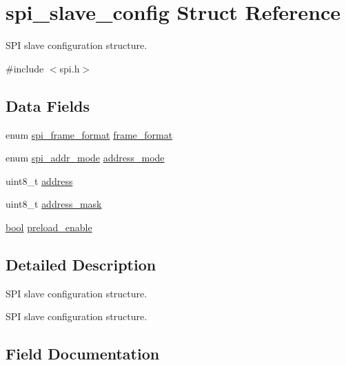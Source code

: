 \hypertarget{structspi__slave__config}{}\section{spi\+\_\+slave\+\_\+config Struct Reference}
\label{structspi__slave__config}


S\+PI slave configuration structure.  




{\ttfamily \#include $<$spi.\+h$>$}

\subsection*{Data Fields}
\begin{DoxyCompactItemize}
\item 
enum \mbox{\hyperlink{group__asfdoc__sam0__sercom__spi__group_ga4598fb059ff90fccf8c9fa5b421f1bda}{spi\+\_\+frame\+\_\+format}} \mbox{\hyperlink{structspi__slave__config_a74521dd3e152916391c75b1d5842aed5}{frame\+\_\+format}}
\item 
enum \mbox{\hyperlink{group__asfdoc__sam0__sercom__spi__group_ga30bf0ce7e5f944a5d3a42d90f0ebf617}{spi\+\_\+addr\+\_\+mode}} \mbox{\hyperlink{structspi__slave__config_ab51e723c0861a0d74da7dbd7a314a597}{address\+\_\+mode}}
\item 
uint8\+\_\+t \mbox{\hyperlink{structspi__slave__config_af3f726014b044194def151079f1f2d89}{address}}
\item 
uint8\+\_\+t \mbox{\hyperlink{structspi__slave__config_aef3149bd852a6bfc8c9146a309d8500c}{address\+\_\+mask}}
\item 
\mbox{\hyperlink{group__group__sam0__utils_ga97a80ca1602ebf2303258971a2c938e2}{bool}} \mbox{\hyperlink{structspi__slave__config_aebfa9df0ccca8fafada776f75e74da90}{preload\+\_\+enable}}
\end{DoxyCompactItemize}


\subsection{Detailed Description}
S\+PI slave configuration structure. 

S\+PI slave configuration structure. 

\subsection{Field Documentation}
\mbox{\label{structspi__slave__config_af3f726014b044194def151079f1f2d89}} 
